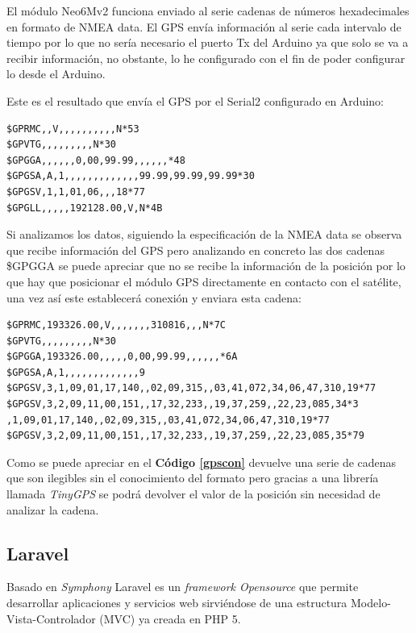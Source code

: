 El módulo Neo6Mv2 funciona enviado al serie cadenas de números hexadecimales en formato de NMEA data. El GPS envía información al serie cada intervalo de tiempo por lo que no sería necesario el puerto Tx del Arduino ya que solo se va a recibir información, no obstante, lo he configurado con el fin de poder configurar lo desde el Arduino.

Este es el resultado que envía el GPS por el Serial2 configurado en Arduino:

\begin{lstlisting}[caption=Cadena Hexadecima del NMEA sin Conexión, label=gpsnocon]
$GPRMC,,V,,,,,,,,,,N*53
$GPVTG,,,,,,,,,N*30
$GPGGA,,,,,,0,00,99.99,,,,,,*48
$GPGSA,A,1,,,,,,,,,,,,,99.99,99.99,99.99*30
$GPGSV,1,1,01,06,,,18*77
$GPGLL,,,,,192128.00,V,N*4B
\end{lstlisting}
Si analizamos los datos, siguiendo la especificación de la NMEA data se observa que recibe información del GPS pero analizando en concreto las dos cadenas \$GPGGA se puede apreciar que no se recibe la información de la posición por lo que hay que posicionar el módulo GPS directamente en contacto con el satélite, una vez así este establecerá conexión y enviara esta cadena:\\


\begin{lstlisting}[caption=Ejemplo para una ID diferente, label=gpscon]
$GPRMC,193326.00,V,,,,,,,310816,,,N*7C
$GPVTG,,,,,,,,,N*30
$GPGGA,193326.00,,,,,0,00,99.99,,,,,,*6A
$GPGSA,A,1,,,,,,,,,,,,,9
$GPGSV,3,1,09,01,17,140,,02,09,315,,03,41,072,34,06,47,310,19*77
$GPGSV,3,2,09,11,00,151,,17,32,233,,19,37,259,,22,23,085,34*3 
,1,09,01,17,140,,02,09,315,,03,41,072,34,06,47,310,19*77
$GPGSV,3,2,09,11,00,151,,17,32,233,,19,37,259,,22,23,085,35*79
\end{lstlisting}

Como se puede apreciar en el \textbf{Código \ref{gpscon}} devuelve una serie de cadenas que son ilegibles sin el conocimiento del formato pero gracias a una librería llamada \textit{TinyGPS} se podrá devolver el valor de la posición sin necesidad de analizar la cadena.

\subsection{Laravel}

Basado en \textit{Symphony} Laravel es un \textit{framework Opensource} que permite desarrollar aplicaciones y servicios web sirviéndose de una estructura Modelo-Vista-Controlador (MVC) ya creada en PHP 5.

